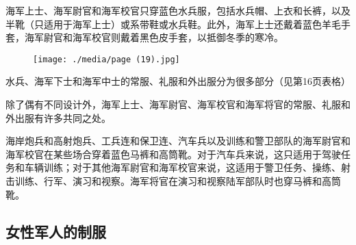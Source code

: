 海军上士、海军尉官和海军校官只穿蓝色水兵服，包括水兵帽、上衣和长裤，以及半靴（只适用于海军上士）或系带鞋或水兵鞋。此外，海军上士还戴着蓝色羊毛手套，海军尉官和海军校官则戴着黑色皮手套，以抵御冬季的寒冷。

\begin{figure}
\texttt{[image: ./media/page (19).jpg]}
\end{figure}

水兵、海军下士和海军中士的常服、礼服和外出服分为很多部分（见第16页表格）%

除了偶有不同设计外，海军上士、海军尉官、海军校官和海军将官的常服、礼服和外出服有许多共同之处。

海岸炮兵和高射炮兵、工兵连和保卫连、汽车兵以及训练和警卫部队的海军尉官和海军校官在某些场合穿着蓝色马裤和高筒靴。对于汽车兵来说，这只适用于驾驶任务和车辆训练；对于其他海军尉官和海军校官来说，这适用于警卫任务、操练、射击训练、行军、演习和视察。海军将官在演习和视察陆军部队时也穿马裤和高筒靴。

\subsection{女性军人的制服}

